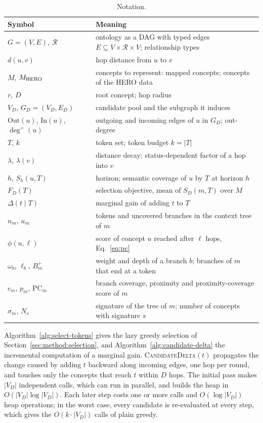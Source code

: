 \begin{table}[h]
\centering
\small
\begin{tabular}{@{}ll@{}}
\toprule
\textbf{Symbol} & \textbf{Meaning} \\
\midrule
$G = (V, E)$, $\mathcal{R}$ & ontology as a DAG with typed edges $E \subseteq V \times \mathcal{R} \times V$; relationship types \\
$d(u, v)$ & hop distance from $u$ to $v$ \\
$M$, $M_{\mathrm{HERO}}$ & concepts to represent: mapped concepts; concepts of the HERO data \\
$r$, $D$ & root concept; hop radius \\
$V_D$, $G_D = (V_D, E_D)$ & candidate pool and the subgraph it induces \\
$\mathrm{Out}(u)$, $\mathrm{In}(u)$, $\deg^+(u)$ & outgoing and incoming edges of $u$ in $G_D$; out-degree \\
$T$, $k$ & token set; token budget $k = |T|$ \\
$\lambda$, $\lambda(v)$ & distance decay; status-dependent factor of a hop into $v$ \\
$h$, $S_h(u, T)$ & horizon; semantic coverage of $u$ by $T$ at horizon $h$ \\
$F_D(T)$ & selection objective, mean of $S_D(m, T)$ over $M$ \\
$\Delta(t \mid T)$ & marginal gain of adding $t$ to $T$ \\
$n_m$, $u_m$ & tokens and uncovered branches in the context tree of $m$ \\
$\phi(u, \ell)$ & score of concept $u$ reached after $\ell$ hops, Eq.~\eqref{eq:pc} \\
$\omega_b$, $\ell_b$, $B^{+}_m$ & weight and depth of a branch $b$; branches of $m$ that end at a token \\
$c_m$, $p_m$, $\mathrm{PC}_m$ & branch coverage, proximity and proximity-coverage score of $m$ \\
$\sigma_m$, $N_s$ & signature of the tree of $m$; number of concepts with signature $s$ \\
\bottomrule
\end{tabular}
\caption{Notation.}
\label{tab:notation}
\end{table}

Algorithm~\ref{alg:select-tokens} gives the lazy greedy selection of Section~\ref{sec:method:selection}, and Algorithm~\ref{alg:candidate-delta} the incremental computation of a marginal gain.
\textsc{CandidateDelta}$(t)$ propagates the change caused by adding $t$ backward along incoming edges, one hop per round, and touches only the concepts that reach $t$ within $D$ hops.
The initial pass makes $|V_D|$ independent calls, which can run in parallel, and builds the heap in $O(|V_D| \log |V_D|)$.
Each later step costs one or more calls and $O(\log |V_D|)$ heap operations; in the worst case, every candidate is re-evaluated at every step, which gives the $O(k \cdot |V_D|)$ calls of plain greedy.


